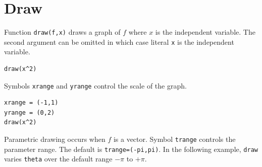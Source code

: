 
\newpage

\section{Draw}

Function \verb$draw(f,x)$ draws a graph of $f$ where $x$ is the independent variable.
The second argument can be omitted in which case literal \verb$x$ is the independent variable.

{\color{blue}
\begin{verbatim}
draw(x^2)
\end{verbatim}}


\begin{center}
\end{center}

Symbols \verb$xrange$ and \verb$yrange$ control the scale of the graph.

{\color{blue}
\begin{verbatim}
xrange = (-1,1)
yrange = (0,2)
draw(x^2)
\end{verbatim}}

\begin{center}
\end{center}

\newpage

Parametric drawing occurs when $f$ is a vector.
Symbol \verb$trange$ controls the parameter range.
The default is \verb$trange=(-pi,pi)$.
In the following example, \verb$draw$ varies \verb$theta$
over the default range $-\pi$ to $+\pi$.

